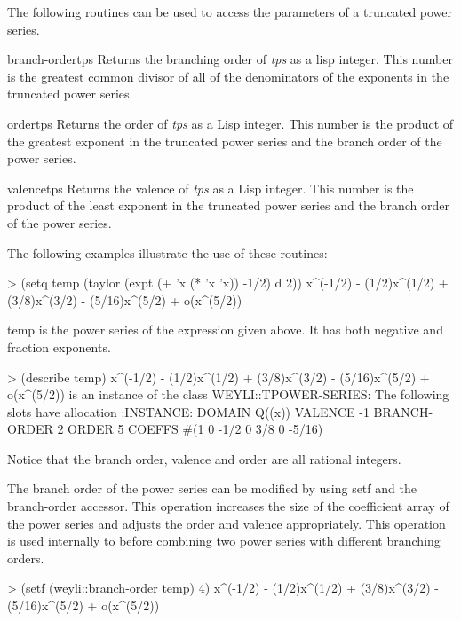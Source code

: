 The following routines can be used to access the parameters of a
truncated power series.
  
\begin{functiondef}{branch-order}{tps}
Returns the branching order of {\em tps} as a
lisp integer. This number is the greatest common divisor
of all of the denominators of the exponents in the truncated
power series.
\end{functiondef}
  
\begin{functiondef}{order}{tps}
Returns the order of {\em tps} as a Lisp integer.
This number is the product of the greatest exponent
in the truncated power series and the branch order of
the power series.
\end{functiondef}
  
\begin{functiondef}{valence}{tps}
Returns the valence of {\em tps} as a Lisp integer.
This number is the product of the least exponent in
the truncated power series and the branch order of the
power series.
\end{functiondef}
  
The following examples illustrate the use of these routines:
\begin{code}
> (setq temp (taylor (expt (+ 'x (* 'x 'x)) -1/2) d 2))
x^(-1/2) - (1/2)x^(1/2) + (3/8)x^(3/2) - (5/16)x^(5/2) + o(x^(5/2))
\end{code}

\noindent
{\sf temp} is the power series of the expression given above. It has
both negative and fraction exponents.

\begin{code}
> (describe temp)
x^(-1/2) - (1/2)x^(1/2) + (3/8)x^(3/2) - (5/16)x^(5/2) + o(x^(5/2))
  is an instance of the class WEYLI::TPOWER-SERIES:
The following slots have allocation :INSTANCE:
DOMAIN          Q((x))
VALENCE         -1
BRANCH-ORDER    2
ORDER           5
COEFFS          #(1 0 -1/2 0 3/8 0 -5/16)
\end{code}
  
Notice that the branch order, valence and order are all rational
integers.
  
The branch order of the power series can be modified by using setf and
the branch-order accessor. This operation increases the size of the
coefficient array of the power series and adjusts the order and
valence appropriately.  This operation is used internally to before
combining two power series with different branching orders.
\begin{code}
> (setf (weyli::branch-order temp) 4)
x^(-1/2) - (1/2)x^(1/2) + (3/8)x^(3/2) - (5/16)x^(5/2) + o(x^(5/2))
\end{code}


